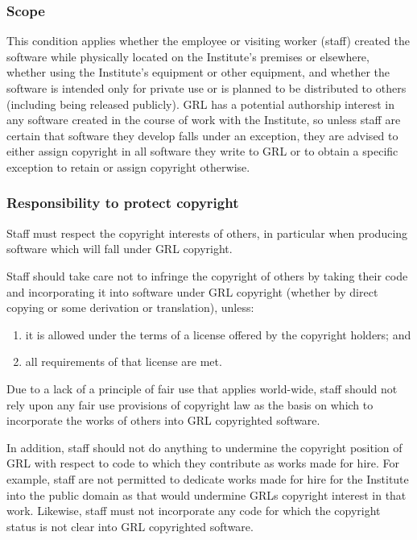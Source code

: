\documentclass[10pt,a4paper]{article}
\begin{document}
\subsubsection{Scope}
\label{policy.copyright.scope}
\par This condition applies whether the employee or visiting worker (staff) 
created the software while physically located on the Institute's premises or 
elsewhere, whether using the Institute's equipment or other equipment, and 
whether the software is intended only for private use or is planned to be 
distributed to others (including being released publicly). GRL has a potential 
authorship interest in any software created in the course of work with the 
Institute, so unless staff are certain that software they develop falls 
under an exception, they are advised to either assign copyright in all software 
they write to GRL or to obtain a specific exception to retain or assign copyright 
otherwise.


\subsubsection{Responsibility to protect copyright}
\label{policy.copyright.protection}

\par Staff must respect the copyright interests of others, in particular when producing 
software which will fall under GRL copyright. 

\par Staff should take care not to infringe the copyright of others by taking their code 
and incorporating it into software under GRL copyright (whether by direct copying 
or some derivation or translation), unless:
\begin{enumerate}
\item it is allowed under the terms of a license offered by the copyright holders; and
\item all requirements of that license are met.
\end{enumerate} 

\par Due to a lack of a principle of fair use that applies world-wide, staff should not 
rely upon any fair use provisions of copyright law as the basis on which to 
incorporate the works of others into GRL copyrighted software. 

\par In addition, staff should not do anything to undermine the copyright position of GRL 
with respect to code to which they contribute as works made for hire. For example, 
staff are not permitted to dedicate works made for hire for the Institute into the 
public domain as that would undermine GRLs copyright interest in that work. 
Likewise, staff must not incorporate any code for which the copyright status is 
not clear into GRL copyrighted software. 
\end{document}
